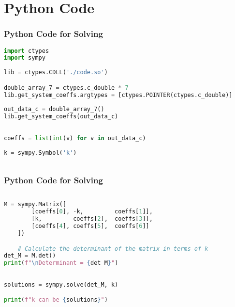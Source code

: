 \documentclass{beamer}
\theoremstyle{remark}
\numberwithin{equation}{section}
\begin{document}
\section{Python Code}
\begin{frame}[fragile]
\frametitle{Python Code for Solving}
\begin{lstlisting}[language=Python]
import ctypes
import sympy
 
lib = ctypes.CDLL('./code.so')

double_array_7 = ctypes.c_double * 7
lib.get_system_coeffs.argtypes = [ctypes.POINTER(ctypes.c_double)]
    
out_data_c = double_array_7()
lib.get_system_coeffs(out_data_c)
    
 
coeffs = list(int(v) for v in out_data_c)
 
k = sympy.Symbol('k')
    

\end{lstlisting}
\end{frame}
\begin{frame}[fragile]
\frametitle{Python Code for Solving}
\begin{lstlisting}[language=Python]
 
M = sympy.Matrix([
        [coeffs[0], -k,         coeffs[1]],  
        [k,         coeffs[2],  coeffs[3]],  
        [coeffs[4], coeffs[5],  coeffs[6]]  
    ])

    # Calculate the determinant of the matrix in terms of k
det_M = M.det()
print(f"\nDeterminant = {det_M}")
    
     
solutions = sympy.solve(det_M, k)

print(f"k can be {solutions}")
\end{lstlisting}
\end{frame}
\end{document}
